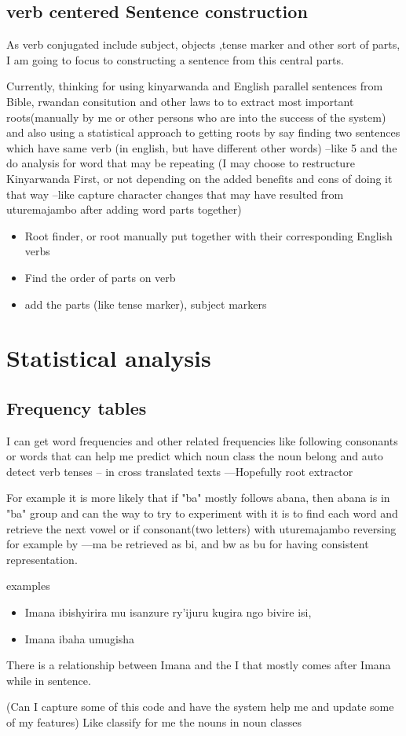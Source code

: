\documentclass[10pt,a4paper]{article}
\begin{document}
\subsection{verb centered Sentence construction}

As verb conjugated include subject, objects ,tense marker and other sort of parts, I am going to focus to constructing a sentence from this central parts. 

Currently, thinking for using kinyarwanda and English parallel sentences from Bible, rwandan consitution and other laws to to extract most important roots(manually by me or other persons who are into the success of the system) and also using a statistical approach to getting roots by say finding two sentences which have same verb (in english, but have different other words) --like 5 and the do analysis for word that may be repeating (I may choose to restructure Kinyarwanda First, or not depending on the added benefits and cons of doing it that way --like capture character changes that may have resulted from uturemajambo after adding word parts together)

\begin{itemize}
	\item Root finder, or root manually put together  with their corresponding English verbs
	\item Find the order of parts on verb
	\item add the parts (like tense marker), subject markers
\end{itemize}



\section{Statistical analysis}

\subsection{Frequency tables}
I can get word frequencies and other related frequencies like following consonants or words that can help me predict which noun class the noun belong and auto detect verb tenses -- in cross translated texts ---Hopefully root extractor

For example it is more likely that if "ba" mostly follows abana, then abana is in "ba" group and can the way to try to experiment with it is to find each word and retrieve the next vowel or if consonant(two letters) with uturemajambo reversing for example by ---ma be retrieved as bi, and bw as bu for having consistent representation.

examples
\begin{itemize}
\item Imana ibishyirira mu isanzure ry'ijuru kugira ngo bivire isi,
\item Imana ibaha umugisha

\end{itemize}

There is a relationship between Imana and the I that mostly comes after Imana while in sentence.  

(Can I capture some of this code and have the system help me and update some of my features)
Like classify for me the nouns in noun classes
\end{document}
